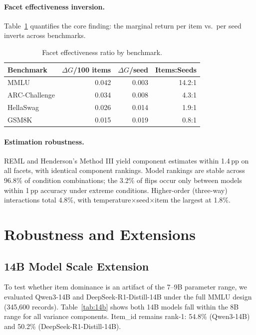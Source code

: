 \documentclass[11pt]{article}
\newcommand{\pp}{\,\text{pp}}
\begin{document}
\paragraph{Facet effectiveness inversion.}
Table~\ref{tab:effectiveness} quantifies the core finding: the marginal return per item vs.\ per seed inverts across benchmarks.

\begin{table}[t]
\centering
\caption{Facet effectiveness ratio by benchmark.}
\label{tab:effectiveness}
\small
\begin{tabular}{lrrr}
\toprule
Benchmark & $\Delta G$/100 items & $\Delta G$/seed & Items:Seeds \\
\midrule
MMLU & 0.042 & 0.003 & 14.2:1 \\
ARC-Challenge & 0.034 & 0.008 & 4.3:1 \\
HellaSwag & 0.026 & 0.014 & 1.9:1 \\
GSM8K & 0.015 & 0.019 & 0.8:1 \\
\bottomrule
\end{tabular}
\end{table}

\paragraph{Estimation robustness.}
REML and Henderson's Method III yield component estimates within 1.4$\pp$ on all facets, with identical component rankings. Model rankings are stable across 96.8\% of condition combinations; the 3.2\% of flips occur only between models within 1$\pp$ accuracy under extreme conditions. Higher-order (three-way) interactions total 4.8\%, with temperature$\times$seed$\times$item the largest at 1.8\%.


\section{Robustness and Extensions}

\subsection{14B Model Scale Extension}
\label{sec:14b}

To test whether item dominance is an artifact of the 7--9B parameter range, we evaluated Qwen3-14B and DeepSeek-R1-Distill-14B under the full MMLU design (345{,}600 records). Table~\ref{tab:14b} shows both 14B models fall within the 8B range for all variance components. Item\_id remains rank-1: 54.8\% (Qwen3-14B) and 50.2\% (DeepSeek-R1-Distill-14B).
\end{document}
